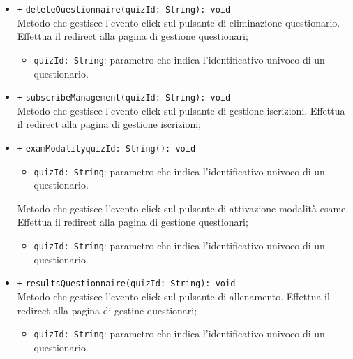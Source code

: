 \begin{itemize}
\begin{itemize}
\begin{itemize}
		\end{itemize}
		\item \texttt{+} \texttt{deleteQuestionnaire(quizId: String): void} \\
		Metodo che gestisce l’evento click sul pulsante di eliminazione questionario. Effettua il redirect alla pagina di gestione questionari;  
		\begin{itemize}
			\item \texttt{quizId: String}: parametro che indica l'identificativo univoco di un questionario.
		\end{itemize}
		\item \texttt{+} \texttt{subscribeManagement(quizId: String): void} \\
		Metodo che gestisce l’evento click sul pulsante di gestione iscrizioni. Effettua il redirect alla pagina di gestione iscrizioni;
		\item \texttt{+} \texttt{examModalityquizId: String(): void} \\
		\begin{itemize}
			\item \texttt{quizId: String}: parametro che indica l'identificativo univoco di un questionario.
		\end{itemize}
		Metodo che gestisce l’evento click sul pulsante di attivazione modalità esame. Effettua il redirect alla pagina di gestione questionari;
		\begin{itemize}
			\item \texttt{quizId: String}: parametro che indica l'identificativo univoco di un questionario.
		\end{itemize}
		\item \texttt{+} \texttt{resultsQuestionnaire(quizId: String): void} \\
		Metodo che gestisce l’evento click sul pulsante di allenamento. Effettua il redirect alla pagina di gestine questionari;
		\begin{itemize}
			\item \texttt{quizId: String}: parametro che indica l'identificativo univoco di un questionario.
		\end{itemize}   
	\end{itemize}
\end{itemize}